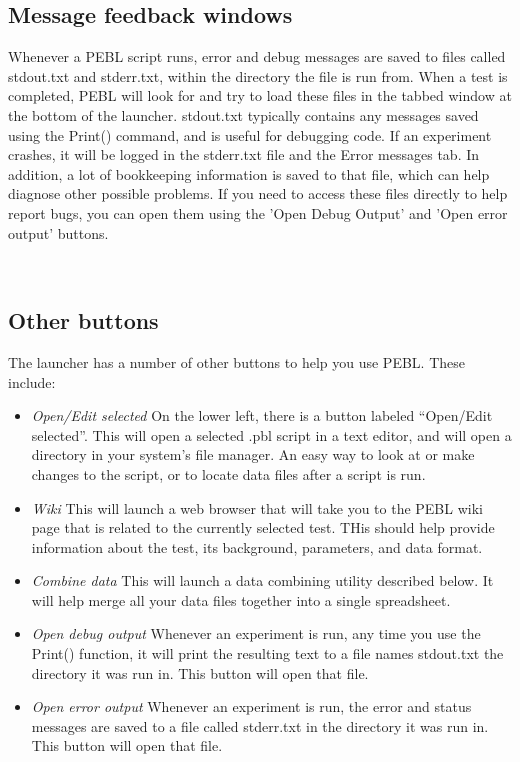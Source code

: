 \subsection{Message feedback windows}
Whenever a PEBL script runs, error and debug messages are saved to files called stdout.txt and stderr.txt, within the directory the file is run from.  When a test is completed, PEBL will look for and try to load these files in the tabbed window at the bottom of the launcher.  stdout.txt typically contains any messages saved using the Print() command, and is useful for debugging code. If an experiment crashes, it will be logged in the stderr.txt file and the Error messages tab.  In addition, a lot of  bookkeeping information is saved to that file, which can help diagnose other possible problems.  If you need to access these files directly to help report bugs, you can open them using the 'Open Debug Output'  and 'Open error output' buttons.

\

\subsection{Other buttons}
The launcher has a number of other buttons to help you use PEBL.
These include:
\begin{itemize}

\item \emph{Open/Edit selected} On the lower left, there is a button labeled ``Open/Edit selected''.  This
  will open a selected .pbl script in a text editor, and will open a
  directory in your system's file manager.  An easy way to look at or
  make changes to the script, or to locate data files after a script is run. 

\item \emph{Wiki} This will launch a web browser that will take you to the PEBL wiki page that is related to the currently selected test.  THis should help provide information about the test, its background, parameters, and data format.


\item\emph{Combine data} This will launch a data combining utility described below.  It will help merge all your data files together into a single spreadsheet.

\item \emph{Open debug output} Whenever an experiment is run, any time
  you use the Print() function, it will print the resulting text to a
  file names stdout.txt the directory it was run in.  This button will
  open that file.

\item \emph{Open error output} Whenever an experiment is run, the
  error and status messages are saved to a file called stderr.txt in
  the directory it was run in.  This button will open that file.


\end{itemize}

